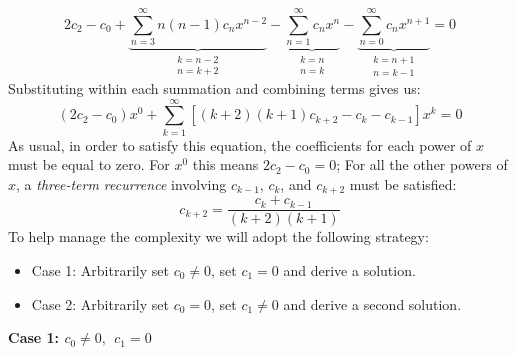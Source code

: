 \begin{equation*}
2c_2 - c_0 + \underbrace{\sum\limits_{n=3}^{\infty}n(n-1)c_nx^{n-2}}_{\substack{k=n-2 \\ n=k+2}} - \underbrace{\sum\limits_{n=1}^{\infty} c_nx^n}_{\substack{k=n \\ n=k}} -\underbrace{\sum\limits_{n=0}^{\infty}c_nx^{n+1}}_{\substack{k=n+1 \\ n=k-1}} = 0
\end{equation*}
Substituting within each summation and combining terms gives us:
\begin{equation*}
(2c_2-c_0)x^0 + \sum\limits_{k=1}^{\infty}\left[(k+2)(k+1)c_{k+2} - c_k - c_{k-1} \right]x^k = 0
\end{equation*}
As usual, in order to satisfy this equation, the coefficients for each power of $x$ must be equal to zero.  For $x^0$ this means $2c_2 - c_0 = 0$;  For all the other powers of $x$, a \emph{three-term recurrence} involving $c_{k-1}$, $c_k$, and $c_{k+2}$ must be satisfied:
\begin{equation*}
c_{k+2} = \frac{c_k + c_{k-1}}{(k+2)(k+1)}
\end{equation*}
To help manage the complexity we will adopt the following strategy:
\begin{itemize}
\item Case 1: Arbitrarily set $c_0 \ne 0$, set $c_1 = 0$ and derive a solution.
\item Case 2: Arbitrarily set $c_0 = 0$, set $c_1 \ne 0$ and derive a second solution.
\end{itemize}

\vspace{0.5cm}

\noindent\textbf{Case 1: $c_0 \ne 0, \ \ c_1=0$}

